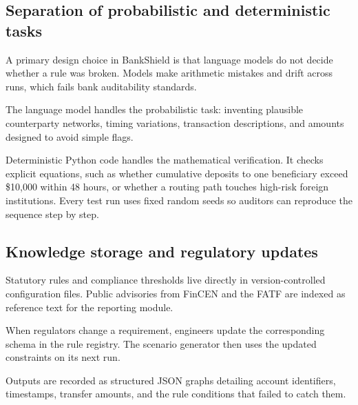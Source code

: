 \documentclass[10pt,twocolumn,a4paper]{article}
\begin{document}
\subsection{Separation of probabilistic and deterministic tasks}
A primary design choice in BankShield is that language models do not decide whether a rule was broken. Models make arithmetic mistakes and drift across runs, which fails bank auditability standards.

The language model handles the probabilistic task: inventing plausible counterparty networks, timing variations, transaction descriptions, and amounts designed to avoid simple flags. 

Deterministic Python code handles the mathematical verification. It checks explicit equations, such as whether cumulative deposits to one beneficiary exceed \$10,000 within 48 hours, or whether a routing path touches high-risk foreign institutions. Every test run uses fixed random seeds so auditors can reproduce the sequence step by step.

\subsection{Knowledge storage and regulatory updates}
Statutory rules and compliance thresholds live directly in version-controlled configuration files. Public advisories from FinCEN and the FATF are indexed as reference text for the reporting module.

When regulators change a requirement, engineers update the corresponding schema in the rule registry. The scenario generator then uses the updated constraints on its next run.

Outputs are recorded as structured JSON graphs detailing account identifiers, timestamps, transfer amounts, and the rule conditions that failed to catch them.
\end{document}

